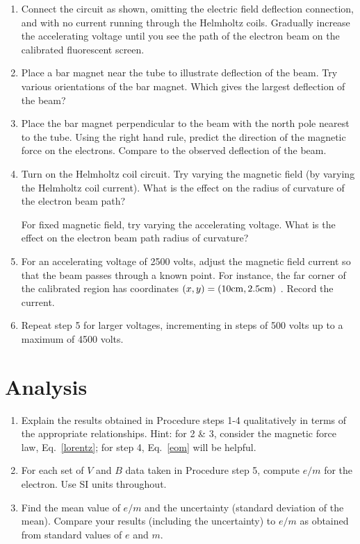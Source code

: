 \begin{enumerate}
\item Connect the circuit as shown, omitting the electric
field deflection connection,  and with no current running through the
Helmholtz coils. Gradually increase the accelerating voltage until you
see the path of the electron beam on the calibrated fluorescent
screen.



\item Place a bar magnet near the tube to illustrate deflection of the beam. Try various orientations of the bar
magnet. Which gives the largest deflection of the beam?


\item Place the bar magnet perpendicular to the beam with the north pole
nearest to the tube. Using the right hand rule, predict the direction
of the magnetic force on the electrons. Compare to the observed
deflection of the beam.


\item Turn on the Helmholtz coil circuit. Try varying the
magnetic field (by varying the Helmholtz coil current). What is the
effect on the radius of curvature of the electron beam path?

For fixed magnetic field, try varying the accelerating voltage. What is
the effect on the electron beam path radius of curvature?


\item For an accelerating voltage of 2500 volts, adjust the magnetic field
current so that the beam passes through a known point.  For instance, the far corner of the
calibrated region has coordinates $(x,y) =  (10 \rm{cm}, 2.5 \rm{cm})$ . Record the current.


\item Repeat step 5 for larger voltages, incrementing in
steps of 500 volts up to a maximum of 4500 volts.
\end{enumerate}

\section{Analysis}

\begin{enumerate}
\item Explain the results obtained in Procedure steps 1-4 qualitatively
in terms of the appropriate relationships. Hint: for 2 \& 3, consider
the magnetic force law, Eq.~\ref{lorentz}; for step 4, Eq.~\ref{eom} will be helpful.

\item For each set of $V$ and $B$ data taken in Procedure step 5, compute $e/m$
for the electron. Use SI units throughout.

\item Find the mean value of $e/m$ and the uncertainty (standard deviation of
the mean). Compare your results (including the uncertainty) to
$e/m$ as obtained from standard values of $e$ and $m$.
\end{enumerate}

